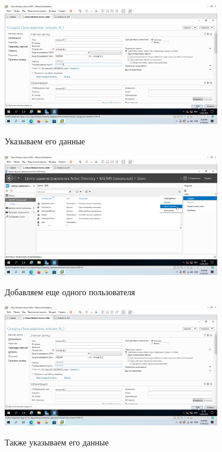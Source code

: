\documentclass[a4paper]{article}
\begin{document}
  \begin{figure}[H]
    \centering
    \includegraphics[width=0.85\textwidth]{5_0083}
    \label{img:83}
    \caption{Указываем его данные}
  \end{figure}

  \begin{figure}[H]
    \centering
    \includegraphics[width=0.85\textwidth]{5_0084}
    \label{img:84}
    \caption{Добавляем еще одного пользователя}
  \end{figure}

  \begin{figure}[H]
    \centering
    \includegraphics[width=0.85\textwidth]{5_0085}
    \label{img:85}
    \caption{Также указываем его данные}
  \end{figure}
\end{document}
